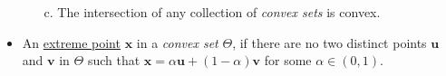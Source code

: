 \documentclass[12pt,thmsa]{article}
\begin{document}
\begin{itemize}
\begin{itemize}
		\item[c.] The intersection of any collection of \textit{convex sets} is convex.
	
	\end{itemize}
	
	
	\item An \underline{extreme point} \(\boldsymbol{x}\) in a \textit{convex set} \(\Theta\), if there are no two distinct points \(\boldsymbol{u}\) and \(\boldsymbol{v}\) in \(\Theta\) such that \(\boldsymbol{x}=\alpha \boldsymbol{u}+(1-\alpha) \boldsymbol{v}\) for some \(\alpha \in(0,1)\).
	
\end{itemize}


\end{document}
